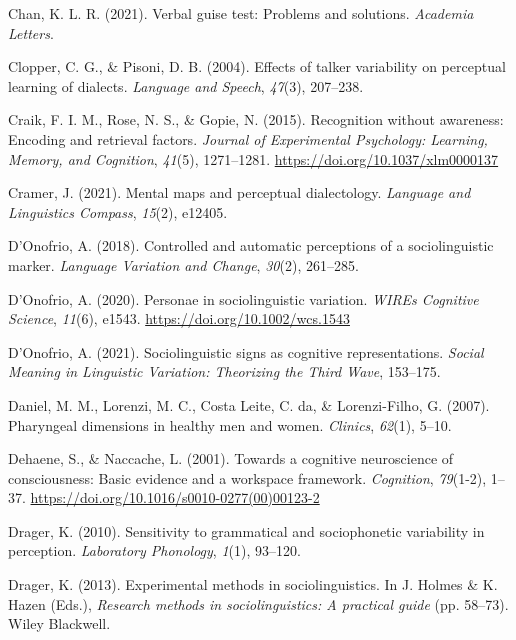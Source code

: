 \documentclass[
  letterpaper,
  DIV=11,
  numbers=noendperiod]{scrartcl}
\newlength{\cslhangindent}
\newenvironment{CSLReferences}[2] %
 {\begin{list}{}{%
  \setlength{\itemindent}{0pt}
  \setlength{\leftmargin}{0pt}
  \setlength{\parsep}{0pt}
  \ifodd #1
   \setlength{\leftmargin}{\cslhangindent}
   \setlength{\itemindent}{-1\cslhangindent}
  \fi
  \setlength{\itemsep}{#2\baselineskip}}}
 {\end{list}}
\begin{document}
\begin{CSLReferences}{1}{0}
Chan, K. L. R. (2021). Verbal guise test: Problems and solutions.
\emph{Academia Letters}.

Clopper, C. G., \& Pisoni, D. B. (2004). Effects of talker variability
on perceptual learning of dialects. \emph{Language and Speech},
\emph{47}(3), 207--238.

Craik, F. I. M., Rose, N. S., \& Gopie, N. (2015). Recognition without
awareness: {Encoding} and retrieval factors. \emph{Journal of
Experimental Psychology: Learning, Memory, and Cognition}, \emph{41}(5),
1271--1281. \url{https://doi.org/10.1037/xlm0000137}

Cramer, J. (2021). Mental maps and perceptual dialectology.
\emph{Language and Linguistics Compass}, \emph{15}(2), e12405.

D'Onofrio, A. (2018). Controlled and automatic perceptions of a
sociolinguistic marker. \emph{Language Variation and Change},
\emph{30}(2), 261--285.

D'Onofrio, A. (2020). Personae in sociolinguistic variation. \emph{WIREs
Cognitive Science}, \emph{11}(6), e1543.
\url{https://doi.org/10.1002/wcs.1543}

D'Onofrio, A. (2021). Sociolinguistic signs as cognitive
representations. \emph{Social Meaning in Linguistic Variation:
Theorizing the Third Wave}, 153--175.

Daniel, M. M., Lorenzi, M. C., Costa Leite, C. da, \& Lorenzi-Filho, G.
(2007). Pharyngeal dimensions in healthy men and women. \emph{Clinics},
\emph{62}(1), 5--10.

Dehaene, S., \& Naccache, L. (2001). Towards a cognitive neuroscience of
consciousness: Basic evidence and a workspace framework.
\emph{Cognition}, \emph{79}(1-2), 1--37.
\url{https://doi.org/10.1016/s0010-0277(00)00123-2}

Drager, K. (2010). Sensitivity to grammatical and sociophonetic
variability in perception. \emph{Laboratory Phonology}, \emph{1}(1),
93--120.

Drager, K. (2013). Experimental methods in sociolinguistics. In J.
Holmes \& K. Hazen (Eds.), \emph{Research methods in sociolinguistics: A
practical guide} (pp. 58--73). Wiley Blackwell.


\end{CSLReferences}
\end{document}
